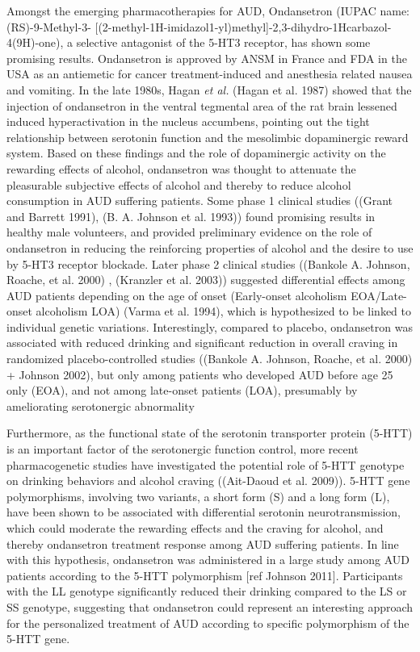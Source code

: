 \documentclass[
  12pt,
]{article}
\begin{document}
Amongst the emerging pharmacotherapies for AUD, Ondansetron (IUPAC name:
(RS)-9-Methyl-3-
{[}(2-methyl-1H-imidazol1-yl)methyl{]}-2,3-dihydro-1Hcarbazol-4(9H)-one),
a selective antagonist of the 5-HT3 receptor, has shown some promising
results. Ondansetron is approved by ANSM in France and FDA in the USA as
an antiemetic for cancer treatment-induced and anesthesia related nausea
and vomiting. In the late 1980s, Hagan \emph{et al.} (Hagan et al. 1987)
showed that the injection of ondansetron in the ventral tegmental area
of the rat brain lessened induced hyperactivation in the nucleus
accumbens, pointing out the tight relationship between serotonin
function and the mesolimbic dopaminergic reward system. Based on these
findings and the role of dopaminergic activity on the rewarding effects
of alcohol, ondansetron was thought to attenuate the pleasurable
subjective effects of alcohol and thereby to reduce alcohol consumption
in AUD suffering patients. Some phase 1 clinical studies ((Grant and
Barrett 1991), (B. A. Johnson et al. 1993)) found promising results in
healthy male volunteers, and provided preliminary evidence on the role
of ondansetron in reducing the reinforcing properties of alcohol and the
desire to use by 5-HT3 receptor blockade. Later phase 2 clinical studies
((Bankole A. Johnson, Roache, et al. 2000) , (Kranzler et al. 2003))
suggested differential effects among AUD patients depending on the age
of onset (Early-onset alcoholism EOA/Late-onset alcoholism LOA) (Varma
et al. 1994), which is hypothesized to be linked to individual genetic
variations. Interestingly, compared to placebo, ondansetron was
associated with reduced drinking and significant reduction in overall
craving in randomized placebo-controlled studies ((Bankole A. Johnson,
Roache, et al. 2000) + Johnson 2002), but only among patients who
developed AUD before age 25 only (EOA), and not among late-onset
patients (LOA), presumably by ameliorating serotonergic abnormality

Furthermore, as the functional state of the serotonin transporter
protein (5-HTT) is an important factor of the serotonergic function
control, more recent pharmacogenetic studies have investigated the
potential role of 5-HTT genotype on drinking behaviors and alcohol
craving ((Ait-Daoud et al. 2009)). 5-HTT gene polymorphisms, involving
two variants, a short form (S) and a long form (L), have been shown to
be associated with differential serotonin neurotransmission, which could
moderate the rewarding effects and the craving for alcohol, and thereby
ondansetron treatment response among AUD suffering patients. In line
with this hypothesis, ondansetron was administered in a large study
among AUD patients according to the 5-HTT polymorphism {[}ref Johnson
2011{]}. Participants with the LL genotype significantly reduced their
drinking compared to the LS or SS genotype, suggesting that ondansetron
could represent an interesting approach for the personalized treatment
of AUD according to specific polymorphism of the 5-HTT gene.
\end{document}

